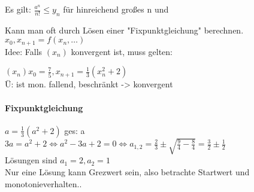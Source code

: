 \documentclass{../tudscript}
\begin{document}
		
		Es gilt: $\frac{a^n}{n!} \leq y_n$ für hinreichend großes n
		und
	
		Kann man oft durch Lösen einer "Fixpunktgleichung" berechnen. \\
		
		$x_0, x_{n+1} = f(x_n,\dots)$ \\
		
		Idee: Falls $(x_n)$ konvergent ist, muss gelten: \\
		
			$(x_n) x_0 = \frac{7}{5}, x_{n+1} = \frac{1}{3} (x^2_n + 2)$ \\
			Ü: ist mon. fallend, beschränkt -> konvergent \\
			
	
		\paragraph{Fixpunktgleichung}
			$a = \frac{1}{3} (a^2 + 2)$ ges: a \\
			$3a = a^2 + 2 \iff a^2 - 3a + 2 = 0 \iff a_{1,2} = \frac{2}{3} \pm \sqrt{\frac{9}{4} - \frac{8}{4}} = \frac{3}{2} \pm \frac{1}{2}$ \\
			Lösungen sind $a_1 = 2, a_2 = 1$ \\
			Nur eine Lösung kann Grezwert sein, also betrachte Startwert und monotonieverhalten.. \\
			
\end{document}
